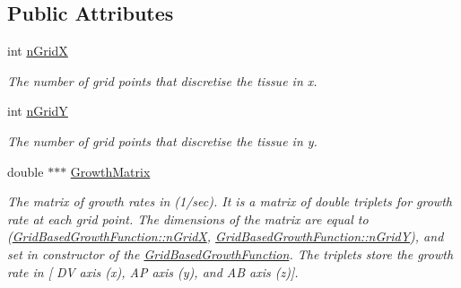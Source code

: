 \subsection*{Public Attributes}
\begin{DoxyCompactItemize}
\item 
\hypertarget{classGridBasedGrowthFunction_af872b9963f3a579dcd615c23bcb58a86}{}int \hyperlink{classGridBasedGrowthFunction_af872b9963f3a579dcd615c23bcb58a86}{n\+Grid\+X}\label{classGridBasedGrowthFunction_af872b9963f3a579dcd615c23bcb58a86}

\begin{DoxyCompactList}\small\item\em The number of grid points that discretise the tissue in x. \end{DoxyCompactList}\item 
\hypertarget{classGridBasedGrowthFunction_a625bc963a1f1e7d1f1a35dbd0ef51728}{}int \hyperlink{classGridBasedGrowthFunction_a625bc963a1f1e7d1f1a35dbd0ef51728}{n\+Grid\+Y}\label{classGridBasedGrowthFunction_a625bc963a1f1e7d1f1a35dbd0ef51728}

\begin{DoxyCompactList}\small\item\em The number of grid points that discretise the tissue in y. \end{DoxyCompactList}\item 
\hypertarget{classGridBasedGrowthFunction_a5522d9b84fa95ebd65cdf290a4f0a65c}{}double $\ast$$\ast$$\ast$ \hyperlink{classGridBasedGrowthFunction_a5522d9b84fa95ebd65cdf290a4f0a65c}{Growth\+Matrix}\label{classGridBasedGrowthFunction_a5522d9b84fa95ebd65cdf290a4f0a65c}

\begin{DoxyCompactList}\small\item\em The matrix of growth rates in (1/sec). It is a matrix of double triplets for growth rate at each grid point. The dimensions of the matrix are equal to (\hyperlink{classGridBasedGrowthFunction_af872b9963f3a579dcd615c23bcb58a86}{Grid\+Based\+Growth\+Function\+::n\+Grid\+X}, \hyperlink{classGridBasedGrowthFunction_a625bc963a1f1e7d1f1a35dbd0ef51728}{Grid\+Based\+Growth\+Function\+::n\+Grid\+Y}), and set in constructor of the \hyperlink{classGridBasedGrowthFunction}{Grid\+Based\+Growth\+Function}. The triplets store the growth rate in \mbox{[} D\+V axis (x), A\+P axis (y), and A\+B axis (z)\mbox{]}. \end{DoxyCompactList}\end{DoxyCompactItemize}


